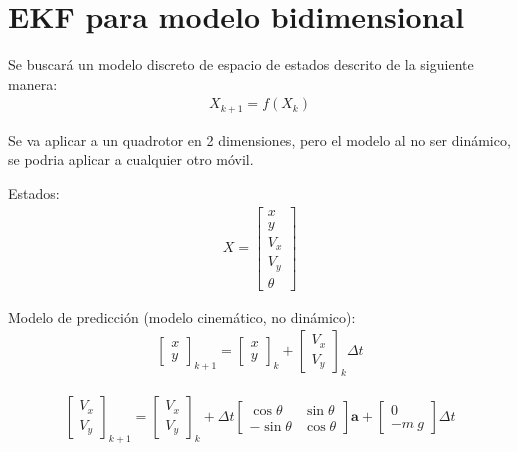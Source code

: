 \section{EKF para modelo bidimensional}
Se buscará un modelo discreto de espacio de estados descrito de la siguiente manera:
\begin{align}
X_{k+1} =  f(X_k)
\end{align}

Se va aplicar a un quadrotor en 2 dimensiones, pero el modelo al no ser dinámico, se podria aplicar a cualquier otro móvil.

Estados:
\begin{align}
X = 
\begin{bmatrix} 
x \\ y \\ V_x \\ V_y \\ \theta
\end{bmatrix}
\end{align}

Modelo de predicción (modelo cinemático, no dinámico):
\begin{align}
\begin{bmatrix} 
x \\ y 
\end{bmatrix}_{k+1}
=
\begin{bmatrix} 
x \\ y 
\end{bmatrix}_k
+
\begin{bmatrix} 
V_x \\ V_y 
\end{bmatrix}_k
\Delta t
\end{align}

\begin{align}
\begin{bmatrix} 
V_x \\ V_y 
\end{bmatrix}_{k+1}
=
\begin{bmatrix} 
V_x \\ V_y 
\end{bmatrix}_k + 
\Delta t
\begin{bmatrix} 
\cos{\theta} & \sin{\theta} \\ -\sin{\theta} & \cos{\theta}
\end{bmatrix}
\bm{a} +  
\begin{bmatrix} 
0 \\ - m\ g 
\end{bmatrix}\Delta t
\end{align}

